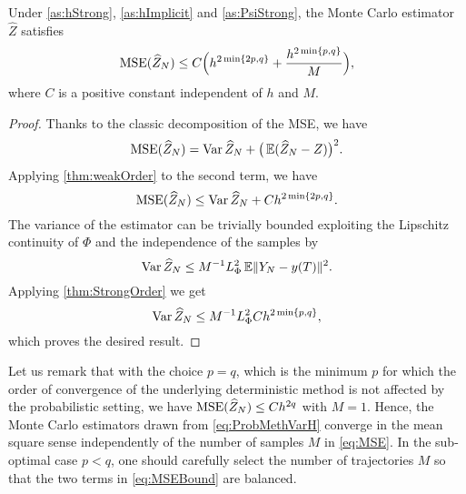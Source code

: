 \documentclass[10pt]{article}
\begin{document}
\begin{theorem}\label{thm:MSEMonteCarlo} Under \cref{as:hStrong}, \cref{as:hImplicit} and \cref{as:PsiStrong}, the Monte Carlo estimator $\hat Z$ satisfies
	\begin{equation}\label{eq:MSEBound}
		\operatorname{MSE}(\widehat Z_N) \leq C\Big(h^{2\min\{2p, q\}} + \frac{h^{2\min\{p, q\}}}{M}\Big),
	\end{equation}
	where $C$ is a positive constant independent of $h$ and $M$.
\end{theorem}
\begin{proof} Thanks to the classic decomposition of the MSE, we have
	\begin{equation}\label{eq:MSEDecomposition}
		\operatorname{MSE}(\widehat Z_N) = \operatorname{Var} \widehat Z_N  + \big(\operatorname{\mathbb{E}}(\widehat Z_N - Z)\big)^2.
	\end{equation}
	Applying \cref{thm:weakOrder} to the second term, we have
	\begin{equation}\label{eq:MSEWeakOrder}
		\operatorname{MSE}(\widehat Z_N) \leq \operatorname{Var} \widehat Z_N  + Ch^{2\min\{2p, q\}}.
	\end{equation}
	The variance of the estimator can be trivially bounded exploiting the Lipschitz continuity of $\Phi$ and the independence of the samples by
	\begin{equation}\label{eq:MSELipschitz}
		\operatorname{Var}\widehat Z_N \leq M^{-1} L_\Phi^2 \operatorname{\mathbb{E}} \lVert Y_N - y(T)\rVert^2.
	\end{equation}
	Applying \cref{thm:StrongOrder} we get
	\begin{equation}
		\operatorname{Var}\widehat Z_N \leq M^{-1} L_\Phi^2 Ch^{2\min\{p, q\}},
	\end{equation}
	which proves the desired result.
\end{proof}
Let us remark that with the choice $p = q$, which is the minimum $p$ for which the order of convergence of the underlying deterministic method is not affected by the probabilistic setting, we have $\operatorname{MSE}(\widehat Z_N) \leq Ch^{2q}$ with $M = 1$. Hence, the Monte Carlo estimators drawn from \eqref{eq:ProbMethVarH} converge in the mean square sense independently of the number of samples $M$ in \eqref{eq:MSE}. In the sub-optimal case $p < q$, one should carefully select the number of trajectories $M$ so that the two terms in \eqref{eq:MSEBound} are balanced.
\end{document}
